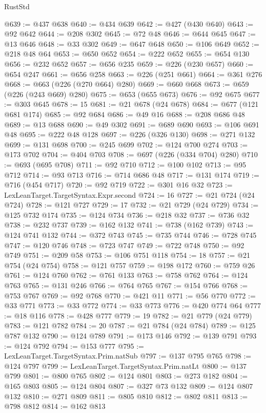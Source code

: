 \begin{lexlean}{RustStd}
\begin{coremodule}
{\begin{coremodule}
{{{{{{{{{{{{{{{{{{{{{{{{{{{{{{{{{{{{{@639 := @437 @638
@640 := @434 @639
@642 := @427 (@430 @640)
@643 := @92 @642
@644 := @208 @302
@645 := @72 @48
@646 := @644 @645
@647 := @13 @646
@648 := @33 @302
@649 := @647 @648
@650 := @106 @649
@652 := @218 @48 @64
@653 := @650 @652
@654 := @222 @652
@655 := @654 @130
@656 := @232 @652
@657 := @656 @235
@659 := @226 (@230 @657)
@660 := @654 @247
@661 := @656 @258
@663 := @226 (@251 @661)
@664 := @361 @276
@668 := @663 (@226 (@270 @664) @280)
@669 := @660 @668
@673 := @659 (@226 (@243 @669) @280)
@675 := @653 (@655 @673)
@676 := @92 @675
@677 := @303 @645
@678 := 15
@681 := @21 @678 (@24 @678)
@684 := @677 (@121 @681 @174)
@685 := @92 @684
@686 := @49 @16
@688 := @208 @686 @48
@689 := @13 @688
@690 := @49 @302
@691 := @689 @690
@693 := @106 @691 @48
@695 := @222 @48 @128
@697 := @226 (@326 @130)
@698 := @271 @132
@699 := @131 @698
@700 := @245 @699
@702 := @124 @700 @274
@703 := @173 @702
@704 := @404 @703
@708 := @697 (@226 (@334 @704) @280)
@710 := @693 (@695 @708)
@711 := @92 @710
@712 := @100 @102
@713 := @95 @712
@714 := @93 @713
@716 := @714 @686 @48
@717 := @131 @174
@719 := @716 (@454 @717)
@720 := @92 @719
@722 := @301 @16 @32
@723 := LexLeanTarget.TargetSyntax.Expr.second
@724 := 16
@727 := @21 @724 (@24 @724)
@728 := @121 @727
@729 := 17
@732 := @21 @729 (@24 @729)
@734 := @125 @732 @174
@735 := @124 @734
@736 := @218 @32
@737 := @736 @32
@738 := @232 @737
@739 := @162 @132
@741 := @738 (@162 @739)
@743 := @124 @741 @132
@744 := @372 @743
@745 := @735 @744
@746 := @728 @745
@747 := @120 @746
@748 := @723 @747
@749 := @722 @748
@750 := @92 @749
@751 := @209 @58
@753 := @106 @751 @118
@754 := 18
@757 := @21 @754 (@24 @754)
@758 := @121 @757
@759 := @198 @172
@760 := @759 @26
@761 := @124 @760
@762 := @761 @133
@763 := @758 @762
@764 := @124 @763
@765 := @131 @246
@766 := @764 @765
@767 := @154 @766
@768 := @753 @767
@769 := @92 @768
@770 := @421 @11
@771 := @56 @770
@772 := @33 @771
@773 := @33 @772
@774 := @33 @773
@776 := @420 @774 @64
@777 := @18 @116
@778 := @428 @777
@779 := 19
@782 := @21 @779 (@24 @779)
@783 := @121 @782
@784 := 20
@787 := @21 @784 (@24 @784)
@789 := @125 @787 @132
@790 := @124 @789
@791 := @173 @146
@792 := @139 @791
@793 := @124 @792
@794 := @153 @777
@795 := LexLeanTarget.TargetSyntax.Prim.natSub
@797 := @137 @795 @765
@798 := @124 @797
@799 := LexLeanTarget.TargetSyntax.Prim.natLt
@800 := @137 @799
@801 := @800 @765
@802 := @124 @801
@803 := @273 @182
@804 := @165 @803
@805 := @124 @804
@807 := @327 @73 @132
@809 := @124 @807 @132
@810 := @271 @809
@811 := @805 @810
@812 := @802 @811
@813 := @798 @812
@814 := @162 @813
}}}}}}}}}}}}}}}}}}}}}}}}}}}}}}}}}}}}}
\end{coremodule}}
\end{coremodule}
\end{lexlean}
